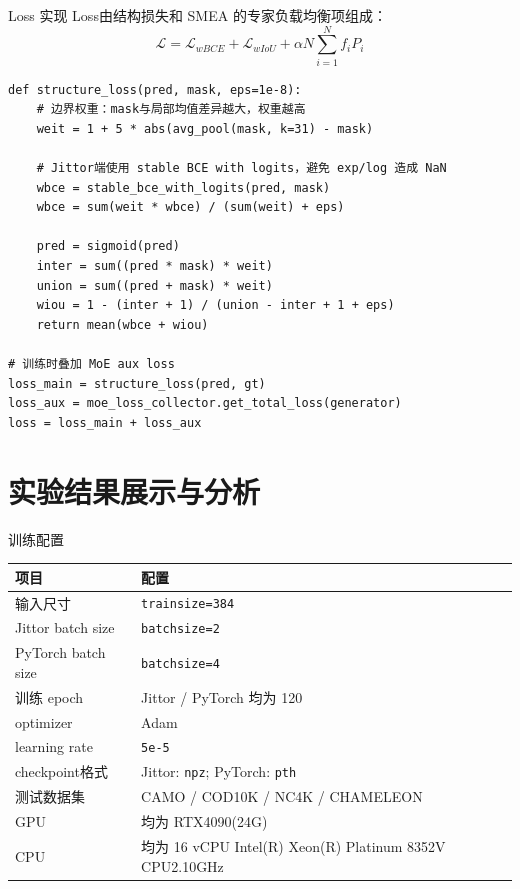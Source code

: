 \begin{frame}[fragile]{Loss 实现}
Loss由结构损失和 SMEA 的专家负载均衡项组成：
\[
  \mathcal{L} = \mathcal{L}_{wBCE} + \mathcal{L}_{wIoU} + \alpha N \sum_{i=1}^{N} f_i P_i
\]
\begin{lstlisting}[style=pythoncode,basicstyle=\ttfamily\tiny]
def structure_loss(pred, mask, eps=1e-8):
    # 边界权重：mask与局部均值差异越大，权重越高
    weit = 1 + 5 * abs(avg_pool(mask, k=31) - mask)

    # Jittor端使用 stable BCE with logits，避免 exp/log 造成 NaN
    wbce = stable_bce_with_logits(pred, mask)
    wbce = sum(weit * wbce) / (sum(weit) + eps)

    pred = sigmoid(pred)
    inter = sum((pred * mask) * weit)
    union = sum((pred + mask) * weit)
    wiou = 1 - (inter + 1) / (union - inter + 1 + eps)
    return mean(wbce + wiou)

# 训练时叠加 MoE aux loss
loss_main = structure_loss(pred, gt)
loss_aux = moe_loss_collector.get_total_loss(generator)
loss = loss_main + loss_aux
\end{lstlisting}
\end{frame}

\section{实验结果展示与分析}

\begin{frame}{训练配置}
  \small
  \renewcommand{\arraystretch}{1.2}
  \begin{tabular}{p{} p{}}
    \toprule
    项目 & 配置 \\
    \midrule
    输入尺寸 & \texttt{trainsize=384} \\
    Jittor batch size & \texttt{batchsize=2} \\
    PyTorch batch size & \texttt{batchsize=4} \\
    训练 epoch & Jittor / PyTorch 均为 120 \\
    optimizer & Adam \\
    learning rate & \texttt{5e-5} \\
    checkpoint格式 & Jittor: \texttt{npz}; PyTorch: \texttt{pth} \\
    测试数据集 & CAMO / COD10K / NC4K / CHAMELEON \\
    GPU & 均为 RTX4090(24G) \\
    CPU & 均为 16 vCPU Intel(R) Xeon(R) Platinum 8352V CPU2.10GHz \\
    \bottomrule
  \end{tabular}
\end{frame}


